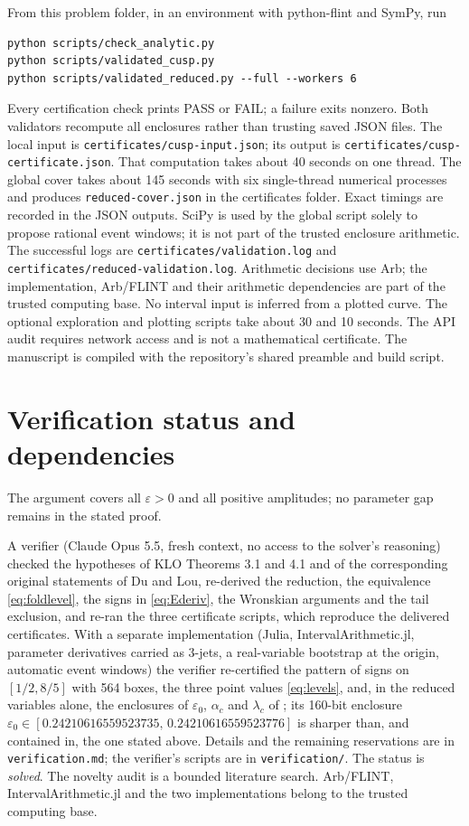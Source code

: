 \documentclass[11pt,a4paper]{report}
\begin{document}
From this problem folder, in an environment with python-flint and SymPy, run
\begin{verbatim}
python scripts/check_analytic.py
python scripts/validated_cusp.py
python scripts/validated_reduced.py --full --workers 6
\end{verbatim}
Every certification check prints PASS or FAIL; a failure exits nonzero.
Both validators recompute all enclosures rather than trusting saved JSON
files. The local input is \texttt{certificates/cusp-input.json}; its output is
\texttt{certificates/cusp-certificate.json}. That computation takes about
40 seconds on one thread. The global cover takes about 145 seconds with six
single-thread numerical processes and produces
\texttt{reduced-cover.json} in the certificates folder. Exact timings are recorded in the
JSON outputs. SciPy is used by the global script solely to propose rational
event windows; it is not part of the trusted enclosure arithmetic.
The successful logs are \texttt{certificates/validation.log} and
\texttt{certificates/reduced-validation.log}. Arithmetic decisions use Arb;
the implementation, Arb/FLINT and their arithmetic dependencies are part of
the trusted computing base. No interval input is inferred from a plotted curve.
The optional exploration and plotting scripts take about 30 and 10 seconds.
The API audit requires network access and is not a mathematical certificate.
The manuscript is compiled with the repository's shared preamble and build script.

\section{Verification status and dependencies}
The argument covers all $\varepsilon>0$ and all positive amplitudes; no
parameter gap remains in the stated proof.

A verifier (Claude Opus 5.5, fresh context, no access to the
solver's reasoning) checked the hypotheses of KLO Theorems 3.1 and 4.1 and of
the corresponding original statements of Du and Lou, re-derived the reduction,
the equivalence \eqref{eq:foldlevel}, the signs in \eqref{eq:Ederiv}, the
Wronskian arguments and the tail exclusion, and re-ran the three certificate
scripts, which reproduce the delivered certificates. With a separate
implementation (Julia, IntervalArithmetic.jl, parameter derivatives carried as
3-jets, a real-variable bootstrap at the origin, automatic event windows) the
verifier re-certified the pattern of signs on $[1/2,8/5]$ with 564 boxes, the
three point values \eqref{eq:levels}, and, in the reduced variables alone,
the enclosures of $\varepsilon_0$, $\alpha_c$ and $\lambda_c$ of
; its 160-bit enclosure
$\varepsilon_0\in[0.24210616559523735,\,0.24210616559523776]$ is sharper than,
and contained in, the one stated above. Details and the remaining reservations are in
\texttt{verification.md}; the verifier's scripts are in \texttt{verification/}.
The status is \emph{solved}. The novelty audit is a bounded literature search.
Arb/FLINT, IntervalArithmetic.jl and the two implementations belong to the
trusted computing base.

\clearpage
\paperreferences
\end{document}
